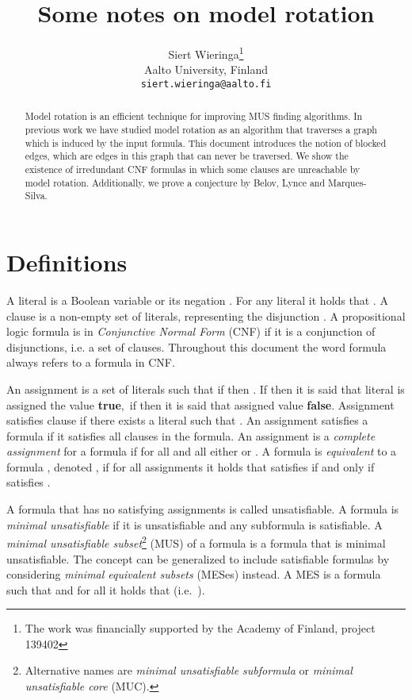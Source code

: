 \documentclass{article}
\author{Siert Wieringa\thanks{The work was financially supported by the Academy of Finland, project 139402} \\\medskip \small{Aalto University, Finland} \\\medskip \small{\texttt{siert.wieringa@aalto.fi}}}
\title{Some notes on model rotation}
\newcounter{algorithms}[section]
\newcommand{\true}{\textbf{true}}
\newcommand{\false}{\textbf{false}}
\begin{document}
\maketitle

\begin{abstract}
Model rotation is an efficient technique for improving MUS finding algorithms.
In previous work we have studied model rotation as an algorithm that traverses a graph which is induced by the input formula.
This document introduces the notion of blocked edges, which are edges in this graph that can never be traversed.
We show the existence of irredundant CNF formulas in which some clauses are unreachable by model rotation.
Additionally, we prove a conjecture by Belov, Lynce and Marques-Silva.
\end{abstract}

\section{Definitions}

A literal  is a Boolean variable  or its negation .
For any literal  it holds that .
A clause  is a non-empty set of literals, representing the disjunction .
A propositional logic formula  is in \emph{Conjunctive Normal Form} (CNF) if it is a conjunction of disjunctions, i.e. a set of clauses.
Throughout this document the word formula always refers to a formula in CNF.

An assignment  is a set of literals such that if  then .
If  then it is said that literal  is assigned the value \true,~if  then  it is said that  assigned value \false.
Assignment  satisfies clause  if there exists a literal  such that .
An assignment satisfies a formula if it satisfies all clauses in the formula.
An assignment  is a \emph{complete assignment} for a formula  if for all  and all  either  or .
A formula  is \emph{equivalent} to a formula , denoted , if for all assignments  it holds that  satisfies  if and only if  satisfies .

A formula that has no satisfying assignments is called unsatisfiable.
A formula  is \emph{minimal unsatisfiable} if it is unsatisfiable and any subformula  is satisfiable.
A \emph{minimal unsatisfiable subset}\footnote{Alternative names are \emph{minimal unsatisfiable subformula} or \emph{minimal unsatisfiable core} (MUC).} (MUS) of a formula  is a formula  that is minimal unsatisfiable.
The concept can be generalized to include satisfiable formulas by considering \emph{minimal equivalent subsets} (MESes) \cite{DBLP:conf/cp/BelovJLM12} instead.
A MES  is a formula such that  and for all  it holds that  (i.e.\ ).
\end{document}
